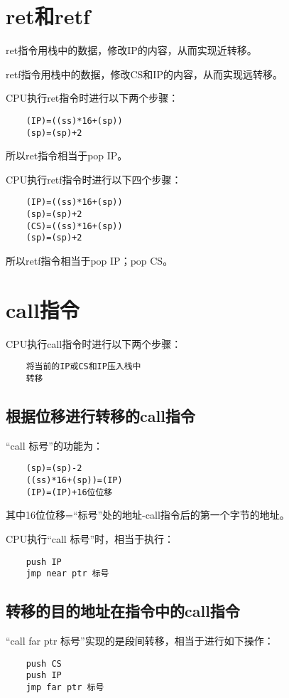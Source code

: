 \documentclass[a4paper,left=2.5cm,right=2.5cm,11pt]{article}
\begin{document}
\tableofcontents

\clearpage

\section{ret和retf}
	ret指令用栈中的数据，修改IP的内容，从而实现近转移。\par

	retf指令用栈中的数据，修改CS和IP的内容，从而实现远转移。\par

	CPU执行ret指令时进行以下两个步骤：
	\begin{lstlisting}
	(IP)=((ss)*16+(sp))
	(sp)=(sp)+2
	\end{lstlisting}

	所以ret指令相当于pop IP。\par

	CPU执行retf指令时进行以下四个步骤：
	\begin{lstlisting}
	(IP)=((ss)*16+(sp))
	(sp)=(sp)+2
	(CS)=((ss)*16+(sp))
	(sp)=(sp)+2
	\end{lstlisting}

	所以retf指令相当于pop IP；pop CS。

\section{call指令}
	CPU执行call指令时进行以下两个步骤：
	\begin{lstlisting}
	将当前的IP或CS和IP压入栈中
	转移
	\end{lstlisting}

\subsection{根据位移进行转移的call指令}
	“call 标号”的功能为：
	\begin{lstlisting}
	(sp)=(sp)-2
	((ss)*16+(sp))=(IP)
	(IP)=(IP)+16位位移
	\end{lstlisting}

	其中16位位移=“标号”处的地址-call指令后的第一个字节的地址。\par

	CPU执行“call 标号”时，相当于执行：
	\begin{lstlisting}
	push IP
	jmp near ptr 标号
	\end{lstlisting}

\subsection{转移的目的地址在指令中的call指令}
	“call far ptr 标号”实现的是段间转移，相当于进行如下操作：
	\begin{lstlisting}
	push CS
	push IP
	jmp far ptr 标号
	\end{lstlisting}
\end{document}
